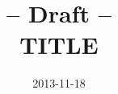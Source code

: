\documentclass[a4paper,10pt,oneside]{article}
\title	{{\scriptsize -- Draft --}\\
		{\Large TITLE}}
\author{  }
\date{2013-11-18}
\begin{document}
\maketitle



\section{\protect\centering}\label{sect:intro}








%
%
\end{document}

